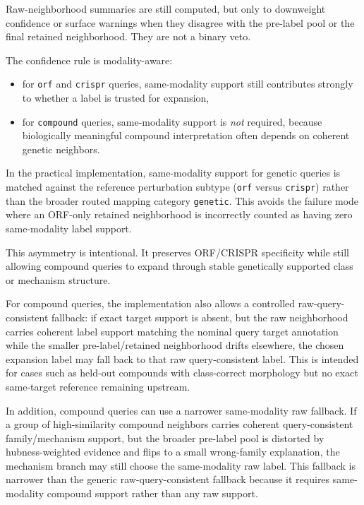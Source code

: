 \documentclass[11pt]{article}
\begin{document}
Raw-neighborhood summaries are still computed, but only to downweight confidence or surface warnings when they disagree with the pre-label pool or the final retained neighborhood. They are not a binary veto.

The confidence rule is modality-aware:
\begin{itemize}[leftmargin=2em]
\item for \texttt{orf} and \texttt{crispr} queries, same-modality support still contributes strongly to whether a label is trusted for expansion,
\item for \texttt{compound} queries, same-modality support is \emph{not} required, because biologically meaningful compound interpretation often depends on coherent genetic neighbors.
\end{itemize}

In the practical implementation, same-modality support for genetic queries is matched against the reference perturbation subtype (\texttt{orf} versus \texttt{crispr}) rather than the broader routed mapping category \texttt{genetic}. This avoids the failure mode where an ORF-only retained neighborhood is incorrectly counted as having zero same-modality label support.

This asymmetry is intentional. It preserves ORF/CRISPR specificity while still allowing compound queries to expand through stable genetically supported class or mechanism structure.

For compound queries, the implementation also allows a controlled raw-query-consistent fallback: if exact target support is absent, but the raw neighborhood carries coherent label support matching the nominal query target annotation while the smaller pre-label/retained neighborhood drifts elsewhere, the chosen expansion label may fall back to that raw query-consistent label. This is intended for cases such as held-out compounds with class-correct morphology but no exact same-target reference remaining upstream.

In addition, compound queries can use a narrower same-modality raw fallback. If a group of high-similarity compound neighbors carries coherent query-consistent family/mechanism support, but the broader pre-label pool is distorted by hubness-weighted evidence and flips to a small wrong-family explanation, the mechanism branch may still choose the same-modality raw label. This fallback is narrower than the generic raw-query-consistent fallback because it requires same-modality compound support rather than any raw support.
\end{document}
